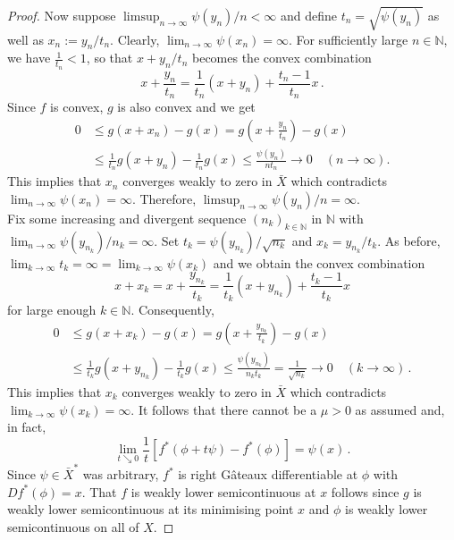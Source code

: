 \documentclass[
	paper=A4,
	pagesize=auto,
	fontsize=12pt
]{scrartcl}
\theoremstyle{plain}
\theoremstyle{remark}
\theoremstyle{definition}
\begin{document}
\begin{proof}
Now suppose $\limsup_{n \to \infty} \psi( y_n ) / n < \infty$ and define $t_n =\sqrt{\psi( y_n )}$ as well as $x_n := y_n / t_n$.
Clearly, $\lim_{n \to \infty} \psi( x_n ) = \infty$.
For sufficiently large $n \in \mathbb{N}$, we have $\frac{1}{t_n} < 1$, so that $x + y_n / t_n$ becomes the convex combination
%
\begin{equation}
x + \frac{y_n}{t_n}
=
\frac{1}{t_n} \left( x + y_n \right) + \frac{t_n -1}{t_n} x \, .
\end{equation}
%
Since $f$ is convex, $g$ is also convex and we get
%
\begin{equation}
\begin{aligned}
0
&\le
g \left( x + x_n \right) - g \left( x \right) 
= 
g \left( x + \frac{y_n}{t_n} \right) - g \left( x \right) \\
&\le
\frac{1}{t_n} g \left( x + y_n \right) - \frac{1}{t_n} g \left( x \right)
\le
\frac{\psi \left( y_n \right)}{n t_n} \to 0 \quad (n \to \infty).
\end{aligned}
\end{equation}
%
This implies that $x_n$ converges weakly to zero in $\bar{X}$ which contradicts $\lim_{n \to \infty} \psi( x_n ) = \infty$.
Therefore, $\limsup_{n \to \infty} \psi( y_n ) / n =\infty$.\\
%
Fix some increasing and divergent sequence $(n_k)_{k \in \mathbb{N}}$ in $\mathbb{N}$ with $\lim_{n \to \infty} \psi( y_{n_k} ) / n_k = \infty$.
Set $t_k = \psi( y_{n_k} ) / \sqrt{n_k}$ and $x_k= y_{n_k} / t_k$.
As before, $\lim_{k \to \infty} t_k = \infty = \lim_{k \to \infty} \psi( x_k )$ and we obtain the convex combination
%
\begin{equation}
x + x_k
=
x + \frac{y_{n_k}}{t_k}
=
\frac{1}{t_k} \left( x + y_{n_k} \right) + \frac{t_k -1}{t_k} x
\end{equation}
%
for large enough $k \in \mathbb{N}$.
Consequently,
%
\begin{equation}
\begin{aligned}
0
&\le
g \left( x + x_k \right) - g \left( x \right)
=
g \left( x + \frac{y_{n_k}}{t_k} \right) - g \left( x \right) \\
&\le
\frac{1}{t_k} g \left( x + y_{n_k} \right) - \frac{1}{t_k} g \left( x \right)
\le
\frac{\psi \left( y_{n_k} \right)}{n_k t_k}
=
\frac{1}{\sqrt{n_k}}
\to 0 \quad (k \to \infty) \, .
\end{aligned}
\end{equation}
%
This implies that $x_k$ converges weakly to zero in $\bar{X}$ which contradicts $\lim_{k \to \infty} \psi( x_k ) = \infty$.
It follows that there cannot be a $\mu > 0$ as assumed and, in fact,
%
\begin{equation}
\lim_{t \searrow 0}\frac{1}{t} \left[ f^* \left( \phi + t \psi \right) - f^* \left( \phi \right) \right] = \psi(x) \, .
\end{equation}
%
Since $\psi \in \bar{X}^*$ was arbitrary, $f^*$ is right Gâteaux differentiable at $\phi$ with $D f^*(\phi) = x$.
That $f$ is weakly lower semicontinuous at $x$ follows since $g$ is weakly lower semicontinuous at its minimising point $x$ and $\phi$ is weakly lower semicontinuous on all of $X$.
\end{proof}
\end{document}

